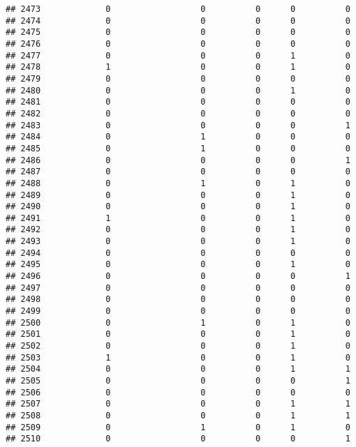 \documentclass[
]{article}
\begin{document}
\begin{verbatim}
## 2473             0                  0          0      0          0
## 2474             0                  0          0      0          0
## 2475             0                  0          0      0          0
## 2476             0                  0          0      0          0
## 2477             0                  0          0      1          0
## 2478             1                  0          0      1          0
## 2479             0                  0          0      0          0
## 2480             0                  0          0      1          0
## 2481             0                  0          0      0          0
## 2482             0                  0          0      0          0
## 2483             0                  0          0      0          1
## 2484             0                  1          0      0          0
## 2485             0                  1          0      0          0
## 2486             0                  0          0      0          1
## 2487             0                  0          0      0          0
## 2488             0                  1          0      1          0
## 2489             0                  0          0      1          0
## 2490             0                  0          0      1          0
## 2491             1                  0          0      1          0
## 2492             0                  0          0      1          0
## 2493             0                  0          0      1          0
## 2494             0                  0          0      0          0
## 2495             0                  0          0      1          0
## 2496             0                  0          0      0          1
## 2497             0                  0          0      0          0
## 2498             0                  0          0      0          0
## 2499             0                  0          0      0          0
## 2500             0                  1          0      1          0
## 2501             0                  0          0      1          0
## 2502             0                  0          0      1          0
## 2503             1                  0          0      1          0
## 2504             0                  0          0      1          1
## 2505             0                  0          0      0          1
## 2506             0                  0          0      0          0
## 2507             0                  0          0      1          1
## 2508             0                  0          0      1          1
## 2509             0                  1          0      1          0
## 2510             0                  0          0      0          1

\end{verbatim}
\end{document}
